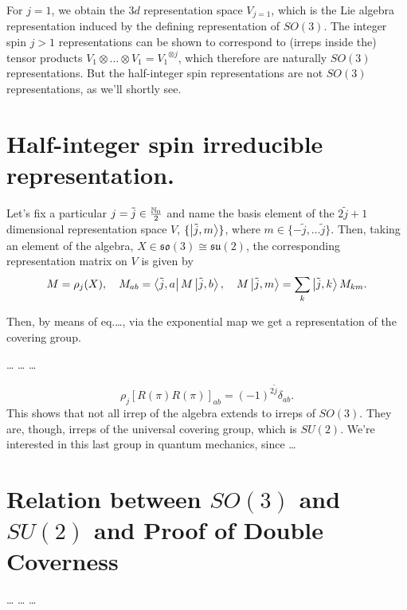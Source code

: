 For $j=1$, we obtain the $3d$ representation space $V_{j=1}$, which is the Lie algebra representation induced by the defining representation of $SO(3)$. The integer spin $j>1$ representations can be shown to correspond to (irreps inside the) tensor
products $V_1 \otimes \dots \otimes V_1 = {V_1}^{\otimes j}$, which therefore are naturally $SO(3)$ representations. But the half-integer spin representations are not $SO(3)$ representations, as we'll shortly see.


\section{Half-integer spin irreducible representation.}
Let's fix a particular $j = \tilde{j} \in \frac{\mathbb{N}_0}{2}$ and name the basis element of the $2 \tilde{j} + 1$ dimensional representation space $V$, $\{ \ket{\tilde{j}, m} \}$, where $m \in \{ -\tilde{j}, \dots \tilde{j} \}$. Then, taking an element of the algebra, $X \in \mathfrak{so}(3) \cong \mathfrak{su}(2)$, the corresponding representation matrix on $V$ is given by
\begin{equation}
    M = \rho_j (X), \quad M_{ab} = \bra{\tilde{j},a} M \ket{\tilde{j},b}, \quad M \ket{\tilde{j}, m} = \sum_k \ket{\tilde{j}, k} M_{km} .
\end{equation}

Then, by means of eq.\dots, via the exponential map we get a representation of the covering group.

\color{red}
\dots
\dots
\dots

\begin{equation}
    \rho_j[R(\pi)R(\pi)]_{ab} = (-1)^{2\tilde{j}} \delta_{ab}.
\end{equation}
This shows that not all irrep of the algebra extends to irreps of $SO(3)$. They are, though, irreps of the universal covering group, which is $SU(2)$. We're interested in this last group in quantum mechanics, since \dots
\color{blue}

\section{Relation between \texorpdfstring{$SO(3)$}{SO(3)} and \texorpdfstring{$SU(2)$}{SU(2)} and Proof of Double Coverness}
\dots
\dots
\dots
\color{black}